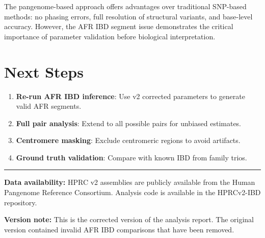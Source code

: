 \documentclass[11pt]{article}
\begin{document}
The pangenome-based approach offers advantages over traditional SNP-based methods: no phasing errors, full resolution of structural variants, and base-level accuracy. However, the AFR IBD segment issue demonstrates the critical importance of parameter validation before biological interpretation.

\section{Next Steps}

\begin{enumerate}
\item \textbf{Re-run AFR IBD inference}: Use v2 corrected parameters to generate valid AFR segments.

\item \textbf{Full pair analysis}: Extend to all possible pairs for unbiased estimates.

\item \textbf{Centromere masking}: Exclude centromeric regions to avoid artifacts.

\item \textbf{Ground truth validation}: Compare with known IBD from family trios.
\end{enumerate}

\vspace{2em}
\hrule
\vspace{1em}
{\small \textbf{Data availability:} HPRC v2 assemblies are publicly available from the Human Pangenome Reference Consortium. Analysis code is available in the HPRCv2-IBD repository.}

\vspace{1em}
{\small \textbf{Version note:} This is the corrected version of the analysis report. The original version contained invalid AFR IBD comparisons that have been removed.}
\end{document}
